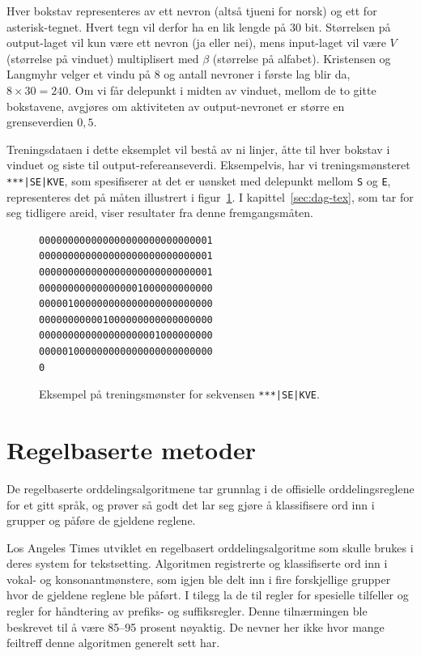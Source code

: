 Hver bokstav representeres av ett nevron (altså tjueni for norsk) og ett for asterisk-tegnet. Hvert tegn vil derfor ha en lik lengde på 30 bit. Størrelsen på output-laget vil kun være ett nevron (ja eller nei), mens input-laget vil være $V$ (størrelse på vinduet) multiplisert med $\beta$ (størrelse på alfabet). Kristensen og Langmyhr velger et vindu på 8 og antall nevroner i første lag blir da, $8\times 30 = 240$. Om vi får delepunkt i midten av vinduet, mellom de to gitte bokstavene, avgjøres om aktiviteten av output-nevronet er større en grenseverdien $0,5$. 

Treningsdataen i dette eksemplet vil bestå av ni linjer, åtte til hver bokstav i vinduet og siste til output-refereanseverdi. Eksempelvis, har vi treningsmønsteret \texttt{***|SE|KVE}, som spesifiserer at det er uønsket med delepunkt mellom \texttt{S} og \texttt{E}, representeres det på måten illustrert i figur~\ref{fig:ordmonst}. I kapittel~\ref{sec:dag-tex}, som tar for seg tidligere areid, viser resultater fra denne fremgangsmåten.

\begin{figure}
\begin{verbatim}
000000000000000000000000000001
000000000000000000000000000001
000000000000000000000000000001
000000000000000001000000000000
000001000000000000000000000000
000000000001000000000000000000
000000000000000000001000000000
000001000000000000000000000000
0
\end{verbatim}
\caption[Eksempel på treningsmønster for nevrale nettverk]{Eksempel på treningsmønster for sekvensen \texttt{***|SE|KVE}.}
\label{fig:ordmonst}
\end{figure}


\section{Regelbaserte metoder}

De regelbaserte orddelingsalgoritmene tar grunnlag i de offisielle orddelingsreglene for et gitt språk, og prøver så godt det lar seg gjøre å klassifisere ord inn i grupper og påføre de gjeldene reglene.

Los Angeles Times utviklet en regelbasert orddelingsalgoritme som skulle brukes i deres system for tekstsetting. Algoritmen registrerte og klassifiserte ord inn i vokal- og konsonantmønstere, som igjen ble delt inn i fire forskjellige grupper hvor de gjeldene reglene ble påført. I tilegg la de til regler for spesielle tilfeller og regler for håndtering av prefiks- og suffiksregler. Denne tilnærmingen ble beskrevet til å være 85--95 prosent nøyaktig. \cite{liang1983word} De nevner her ikke hvor mange feiltreff denne algoritmen generelt sett har. 

